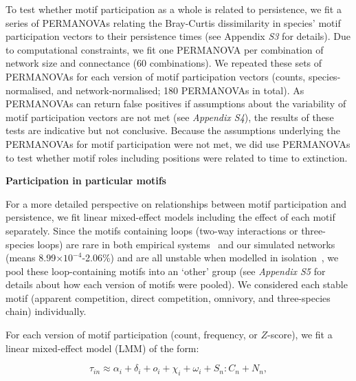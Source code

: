 \documentclass[12pt]{article}
\begin{document}
\begin{spacing}{2.0}
                To test whether motif participation as a whole is related to persistence, we fit a series of PERMANOVAs relating the Bray-Curtis dissimilarity in species' motif participation vectors to their persistence times (see Appendix \emph{S3} for details). 
                Due to computational constraints, we fit one PERMANOVA per combination of network size and connectance (60 combinations). 
                We repeated these sets of PERMANOVAs for each version of motif participation vectors (counts, species-normalised, and network-normalised; 180 PERMANOVAs in total).
                As PERMANOVAs can return false positives if assumptions about the variability of motif participation vectors are not met (see \emph{Appendix S4}), the results of these tests are indicative but not conclusive.
                Because the assumptions underlying the PERMANOVAs for motif participation were not met, we did use PERMANOVAs to test whether motif roles including positions were related to time to extinction.


            \textbf{Participation in particular motifs}

                For a more detailed perspective on relationships between motif participation and persistence, we fit linear mixed-effect models including the effect of each motif separately.
                Since the motifs containing loops (two-way interactions or three-species loops) are rare in both empirical systems~\citep{Stouffer2007} and our simulated networks (means 8.99$\times10^{-4}$-2.06\%) and are all unstable when modelled in isolation~\citep{Borrelli2015a}, we pool these loop-containing motifs into an `other' group (see \emph{Appendix S5} for details about how each version of motifs were pooled). 
                We considered each stable motif (apparent competition, direct competition, omnivory, and three-species chain) individually.


                For each version of motif participation (count, frequency, or $Z$-score), we fit a  linear mixed-effect model (LMM) of the form:

                \begin{equation}
                    \tau_{in} \approx \alpha_{i} + \delta_{i} + o_{i} + \chi_{i} + \omega_{i} + S_{n}:C_{n} +N_n,
                    \label{eq:persistence_motifs}
                \end{equation}


\end{spacing}
\end{document}
